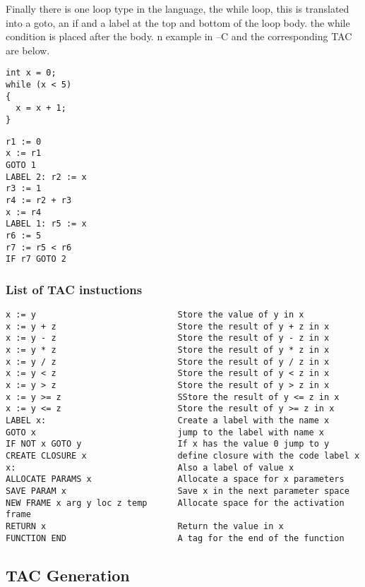 \documentclass{article}
\begin{document}
Finally there is one loop type in the language, the while loop, this is translated
into a goto, an if and a label at the top and bottom of the loop body. the while
condition is placed after the body. n example in --C and the corresponding TAC
are below.

\begin{lstlisting}
int x = 0;
while (x < 5)
{
  x = x + 1;
}
\end{lstlisting}

\begin{lstlisting}
r1 := 0
x := r1
GOTO 1
LABEL 2: r2 := x
r3 := 1
r4 := r2 + r3
x := r4
LABEL 1: r5 := x
r6 := 5
r7 := r5 < r6
IF r7 GOTO 2
\end{lstlisting}

\subsubsection{List of TAC instuctions}
\begin{lstlisting}
x := y                            Store the value of y in x
x := y + z                        Store the result of y + z in x
x := y - z                        Store the result of y - z in x
x := y * z                        Store the result of y * z in x
x := y / z                        Store the result of y / z in x
x := y < z                        Store the result of y < z in x
x := y > z                        Store the result of y > z in x
x := y >= z                       SStore the result of y <= z in x
x := y <= z                       Store the result of y >= z in x
LABEL x:                          Create a label with the name x
GOTO x                            jump to the label with name x
IF NOT x GOTO y                   If x has the value 0 jump to y
CREATE CLOSURE x                  define closure with the code label x
x:                                Also a label of value x
ALLOCATE PARAMS x                 Allocate a space for x parameters
SAVE PARAM x                      Save x in the next parameter space
NEW FRAME x arg y loc z temp      Allocate space for the activation frame
RETURN x                          Return the value in x
FUNCTION END                      A tag for the end of the function
\end{lstlisting}


\subsection{TAC Generation}
\end{document}
